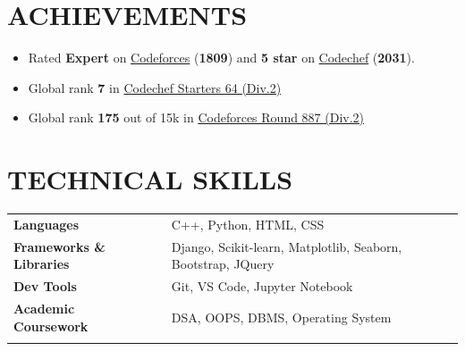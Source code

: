\documentclass[12pt]{article}
\begin{document}
\section*{ACHIEVEMENTS}
\begin{itemize}[leftmargin=20pt, topsep=0.7pt, itemsep=0.7pt, partopsep=0.7pt, parsep=0.7pt]
	\item Rated \textbf{Expert} on \href{https://codeforces.com/profile/prabhavagrawal7}{Codeforces} (\textbf{1809}) and \textbf{5 star} on \href{https://www.codechef.com/users/prabhav7}{Codechef} (\textbf{2031}).
	\item Global rank \textbf{7} in \href{https://www.codechef.com/rankings/START64B?search=prabhav7}{Codechef Starters 64 (Div.2)}
	\item Global rank \textbf{175} out of 15k in \href{https://codeforces.com/contest/1853/standings/participant/159682595#p159682595}{Codeforces Round 887 (Div.2)}
\end{itemize}

\section*{TECHNICAL SKILLS}
\vspace{-2.5pt}
{\small
	\begin{tabular}{@{}llll}
		\textbf{Languages}               &   & C++, Python, HTML, CSS                                       \\
		\textbf{Frameworks \& Libraries} &   & Django, Scikit-learn, Matplotlib, Seaborn, Bootstrap, JQuery \\
		\textbf{Dev Tools}               &   & Git, VS Code, Jupyter Notebook                               \\
		\textbf{Academic Coursework}     &   & DSA, OOPS, DBMS, Operating System                            \\
		\vspace{-\topsep}
	\end{tabular}
}
\end{document}

